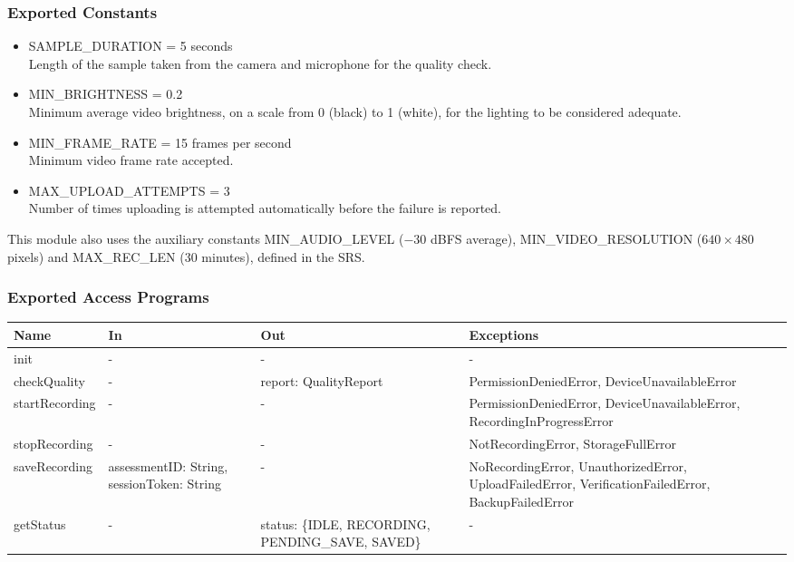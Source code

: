 \documentclass[12pt, titlepage]{article}
\begin{document}
\subsubsection{Exported Constants}
\begin{itemize}
\item SAMPLE\_DURATION = 5 seconds\\
Length of the sample taken from the camera and microphone for the quality check.
\item MIN\_BRIGHTNESS = 0.2\\
Minimum average video brightness, on a scale from 0 (black) to 1 (white), for the lighting to be considered adequate.
\item MIN\_FRAME\_RATE = 15 frames per second\\
Minimum video frame rate accepted.
\item MAX\_UPLOAD\_ATTEMPTS = 3\\
Number of times uploading is attempted automatically before the failure is reported.
\end{itemize}
This module also uses the auxiliary constants MIN\_AUDIO\_LEVEL ($-30$ dBFS average), MIN\_VIDEO\_RESOLUTION ($640 \times 480$ pixels) and MAX\_REC\_LEN (30 minutes), defined in the SRS.

\subsubsection{Exported Access Programs}
\begin{center}
\begin{tabular}{p{3cm} p{4cm} p{3.5cm} p{4.5cm}}
\hline
\textbf{Name} & \textbf{In} & \textbf{Out} & \textbf{Exceptions} \\
\hline
init & - & - & - \\
checkQuality & - & report: QualityReport & PermissionDeniedError, DeviceUnavailableError \\
startRecording & - & - & PermissionDeniedError, DeviceUnavailableError, RecordingInProgressError \\
stopRecording & - & - & NotRecordingError, StorageFullError \\
saveRecording & assessmentID: String, sessionToken: String & - & NoRecordingError, UnauthorizedError, UploadFailedError, VerificationFailedError, BackupFailedError \\
getStatus & - & status: \{IDLE, RECORDING, PENDING\_SAVE, SAVED\} & - \\
\hline
\end{tabular}
\end{center}
\end{document}
